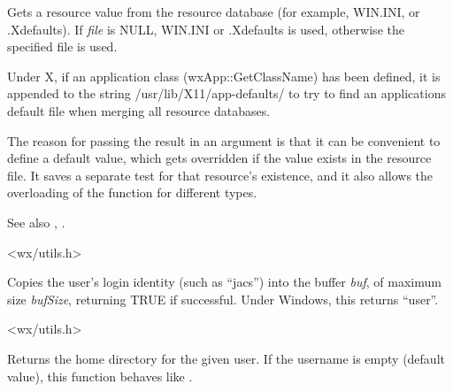 


Gets a resource value from the resource database (for example, WIN.INI, or
.Xdefaults). If {\it file} is NULL, WIN.INI or .Xdefaults is used,
otherwise the specified file is used.

Under X, if an application class (wxApp::GetClassName) has been defined,
it is appended to the string /usr/lib/X11/app-defaults/ to try to find
an applications default file when merging all resource databases.

The reason for passing the result in an argument is that it
can be convenient to define a default value, which gets overridden
if the value exists in the resource file. It saves a separate
test for that resource's existence, and it also allows
the overloading of the function for different types.

See also , .


<wx/utils.h>



Copies the user's login identity (such as ``jacs'') into the buffer {\it
buf}, of maximum size {\it bufSize}, returning TRUE if successful.
Under Windows, this returns ``user''.


<wx/utils.h>

\label{wxgetuserhome}


Returns the home directory for the given user. If the username is empty
(default value), this function behaves like 
.


